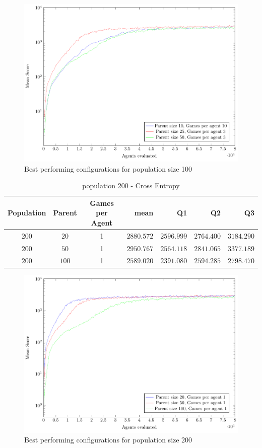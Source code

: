 \begin{figure}[H]
\centering
\includegraphics[scale=1]{data/ce_population_offspring/bestofeach_population/100x/PlotFile.pdf}
\caption{Best performing configurations for population size 100}
\end{figure}

\clearpage

\begin{table}[H]
\centering
\small
\begin{tabular}{c c c r r r r}
Population & Parent & Games per Agent & mean & Q1 & Q2 & Q3\\
\hline
$200$ & $20$ & 1 & $2880.572$ & $2596.999$ & $2764.400$ & $3184.290$\\
$200$ & $50$ & 1 & $2950.767$ & $2564.118$ & $2841.065$ & $3377.189$\\
$200$ & $100$ & 1 & $2589.020$ & $2391.080$ & $2594.285$ & $2798.470$\\
\end{tabular}
\caption{population 200 - Cross Entropy}
\end{table}

\begin{figure}[H]
\centering
\includegraphics[scale=1]{data/ce_population_offspring/bestofeach_population/200x/PlotFile.pdf}
\caption{Best performing configurations for population size 200}
\end{figure}


